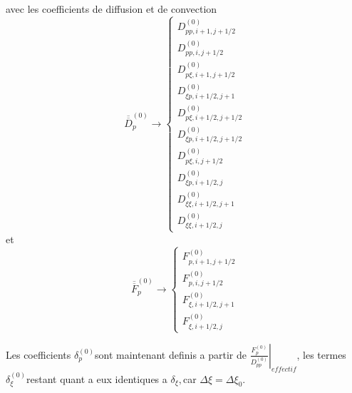  avec les coefficients de diffusion et de convection \[
\overline{\overline{D}}_{p}^{\left(0\right)}\rightarrow\left\{ \begin{array}{l}
D_{pp,i+1,j+1/2}^{\left(0\right)}\\
D_{pp,i,j+1/2}^{\left(0\right)}\\
D_{p\xi,i+1,j+1/2}^{\left(0\right)}\\
D_{\xi p,i+1/2,j+1}^{\left(0\right)}\\
D_{p\xi,i+1/2,j+1/2}^{\left(0\right)}\\
D_{\xi p,i+1/2,j+1/2}^{\left(0\right)}\\
D_{p\xi,i,j+1/2}^{\left(0\right)}\\
D_{\xi p,i+1/2,j}^{\left(0\right)}\\
D_{\xi\xi,i+1/2,j+1}^{\left(0\right)}\\
D_{\xi\xi,i+1/2,j}^{\left(0\right)}\end{array}\right.\]
 et \[
\overline{\overline{F}}_{p}^{\left(0\right)}\rightarrow\left\{ \begin{array}{l}
F_{p,i+1,j+1/2}^{\left(0\right)}\\
F_{p,i,j+1/2}^{\left(0\right)}\\
F_{\xi,i+1/2,j+1}^{\left(0\right)}\\
F_{\xi,i+1/2,j}^{\left(0\right)}\end{array}\right.\]


Les coefficients $\delta_{p}^{\left(0\right)}$sont maintenant definis
a partir de $\left.\frac{F_{p}^{\left(0\right)}}{D_{pp}^{\left(0\right)}}\right|_{effectif}$,
les termes $\delta_{\xi}^{\left(0\right)}$restant quant a eux identiques
a $\delta_{\xi},$car $\Delta\xi=\Delta\xi_{0}.$
